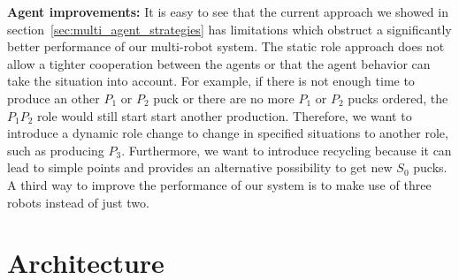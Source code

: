 \textbf{Agent improvements:} It is easy to see that the current approach we showed in section~\ref{sec:multi_agent_strategies} has limitations which obstruct a significantly better performance of our multi-robot system. The static role approach does not allow a tighter cooperation between the agents or that the agent behavior can take the situation into account. For example, if there is not enough time to produce an other $P_1$ or $P_2$ puck or there are no more $P_1$ or $P_2$ pucks ordered, the $P_1P_2$ role would still start start another production. Therefore, we want to introduce a dynamic role change to change in specified situations to another role, such as producing $P_3$. Furthermore, we want to introduce recycling because it can lead to simple points and provides an alternative possibility to get new $S_0$ pucks. A third way to improve the performance of our system is to make use of three robots instead of just two.\\



\section{Architecture}
\label{sec:architecture}

